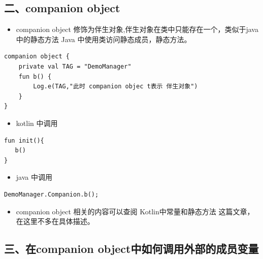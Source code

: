 \documentclass[9pt, b5paper]{article}
\begin{document}
\subsection{二、companion object}
\label{sec-3-2}
\begin{itemize}
\item companion object 修饰为伴生对象,伴生对象在类中只能存在一个，类似于java中的静态方法 Java 中使用类访问静态成员，静态方法。
\end{itemize}
\begin{verbatim}
companion object {
    private val TAG = "DemoManager"
    fun b() {
        Log.e(TAG,"此时 companion objec t表示 伴生对象")
    }
}
\end{verbatim}
\begin{itemize}
\item kotlin 中调用
\end{itemize}
\begin{verbatim}
fun init(){
   b()
}
\end{verbatim}
\begin{itemize}
\item java 中调用
\end{itemize}
\begin{verbatim}
DemoManager.Companion.b();
\end{verbatim}
\begin{itemize}
\item companion object 相关的内容可以查阅 Kotlin中常量和静态方法 这篇文章，在这里不多在具体描述。
\end{itemize}
\subsection{三、在companion object中如何调用外部的成员变量}
\label{sec-3-3}
\end{document}
